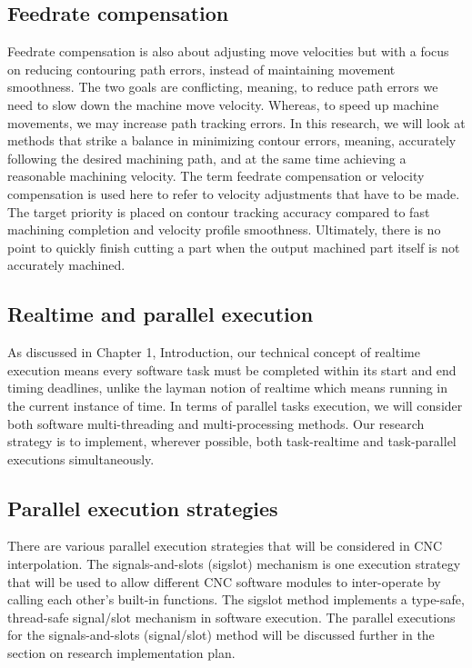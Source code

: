 \subsection{Feedrate compensation}
Feedrate compensation is also about adjusting move velocities but with a focus on reducing contouring path errors, instead of maintaining movement smoothness. The two goals are conflicting, meaning, to reduce path errors we need to slow down the machine move velocity. Whereas, to speed up machine movements, we may increase path tracking errors. In this research, we will look at methods that strike a balance in minimizing contour errors, meaning, accurately following the desired machining path, and at the same time achieving a reasonable machining velocity. The term feedrate compensation or velocity compensation is used here to refer to velocity adjustments that have to be made. The target priority is placed on contour tracking accuracy compared to fast machining completion and velocity profile smoothness. Ultimately, there is no point to quickly finish cutting a part when the output machined part itself is not accurately machined.

\subsection{Realtime and parallel execution}
As discussed in Chapter 1, Introduction, our technical concept of realtime execution means every software task must be completed within its start and end timing deadlines, unlike the layman notion of realtime which means running in the current instance of time. In terms of parallel tasks execution, we will consider both software multi-threading and multi-processing methods. Our research strategy is to implement, wherever possible, both task-realtime and task-parallel executions simultaneously. 

\subsection{Parallel execution strategies}
There are various parallel execution strategies that will be considered in CNC interpolation. The signals-and-slots (sigslot) mechanism is one execution strategy that will be used to allow different CNC software modules to inter-operate by calling each other's built-in functions. The sigslot method implements a type-safe, thread-safe signal/slot mechanism in software execution. The parallel executions for the signals-and-slots (signal/slot) method will be discussed further in the section on research implementation plan. 
\vspace{0.5cm}

